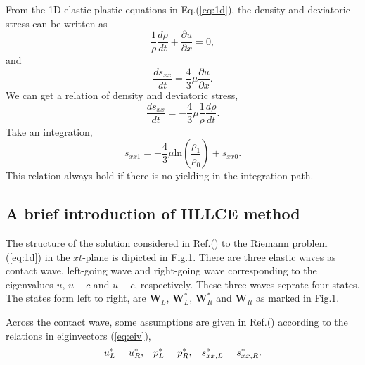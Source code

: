 \documentclass{article}
\theoremstyle{plain}\newtheorem{definition}{\sc{Definition}}
\theoremstyle{defination}\newtheorem{example}{Example}[section]
\numberwithin{equation}{section}
\numberwithin{table}{section}
\begin{document}
  From the 1D elastic-plastic  equations in Eq.(\ref{eq:1d}), the density and deviatoric stress can be written as 
  \begin{equation}
	\frac{1}{\rho}\frac{d\rho}{dt}+\frac{\partial u}{\partial x} =0,
  \end{equation}
  and
  \begin{equation}
	\frac{ds_{xx}}{dt}=\frac{4}{3}\mu\frac{\partial u}{\partial x}.
  \end{equation}
  We can get a relation of density and deviatoric stress,
  \begin{equation}
	\frac{ds_{xx}}{dt}=-\frac{4}{3}\mu \frac{1}{\rho}\frac{d\rho}{dt}.
\end{equation}
Take an integration, 
\begin{equation}\label{eq:rhosxx}
  s_{xx1}=-\frac{4}{3}\mu\text{ln}(\frac{\rho_{1}}{\rho_{0}})+s_{xx0}.
\end{equation}
This relation always hold if there is no yielding in the integration path. 


  \subsection{ A  brief  introduction of HLLCE method \cite{}}

  The structure of the solution considered in Ref.(\cite{}) to the Riemann problem (\ref{eq:1d}) in the $xt$-plane  is dipicted in Fig.1. There are three elastic  waves as contact wave, left-going wave and  right-going  wave  corresponding to the eigenvalues $u$, $u-c$ and $u+c$, respectively. These three waves seprate four  states. The states  form left to right, are  $\bm{W}_L$, $\bm{W}_L^*$, $\bm{W}_R^* $ and $\bm{W}_R$ as marked in Fig.1.

  Across the contact wave, some assumptions are given in Ref.(\cite{}) according to the relations in eiginvectors (\ref{eq:eiv}), 
  \begin{equation}
	u_L^* = u_R^*, \hspace{0.3cm} p_L^* = p_R^*, \hspace{0.3cm} s_{xx,L}^* = s_{xx,R}^*.
  \end{equation}
\end{document}
